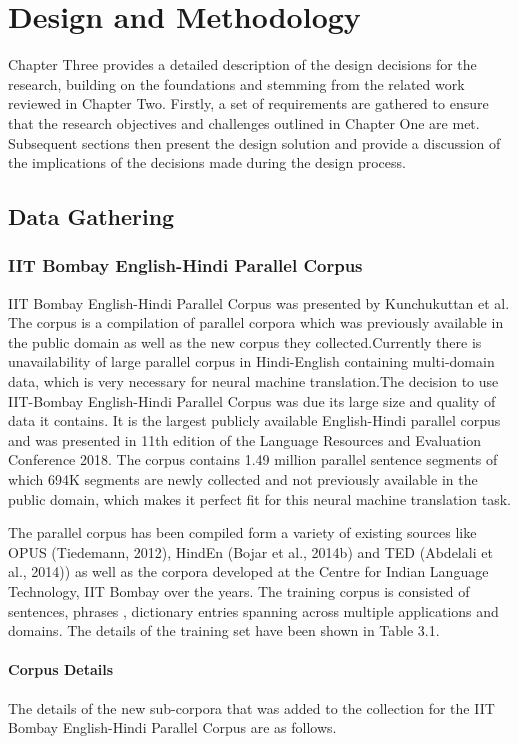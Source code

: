 \chapter{Design and Methodology}
Chapter Three provides a detailed description of the design decisions for the research, building on the foundations and stemming from the related work reviewed in Chapter Two. Firstly, a set of requirements are gathered to ensure that the research objectives and challenges outlined in Chapter One are met. Subsequent sections then present the design solution and provide a discussion of the implications of the decisions made during the design process.
\section{Data Gathering}
\subsection{IIT Bombay English-Hindi Parallel Corpus}
IIT Bombay English-Hindi Parallel Corpus was presented by Kunchukuttan et al. The corpus is a compilation of parallel corpora which was previously available in the public domain as well as the new corpus they collected.Currently there is unavailability of large parallel corpus in Hindi-English containing multi-domain data, which is very necessary for neural machine translation.The decision to use IIT-Bombay English-Hindi Parallel Corpus was due its large size and quality of data it contains. It is the largest publicly available English-Hindi parallel corpus and was presented in 11th edition of the Language Resources and Evaluation Conference 2018. The corpus contains 1.49 million parallel sentence segments of which 694K segments are newly collected and not previously available in the public domain, which makes it perfect fit for this neural machine translation task. 

The parallel corpus has been compiled form a variety of existing sources like OPUS (Tiedemann, 2012), HindEn (Bojar et al., 2014b) and TED (Abdelali et al., 2014)) as well as the corpora developed at the Centre for Indian Language Technology, IIT Bombay over the years. The training corpus is consisted of sentences, phrases , dictionary entries spanning across multiple applications and domains. The details of the training set have been shown in Table 3.1.

\subsubsection{Corpus Details}
The details of the new sub-corpora that was added to the collection for the IIT Bombay English-Hindi Parallel Corpus are as follows.

